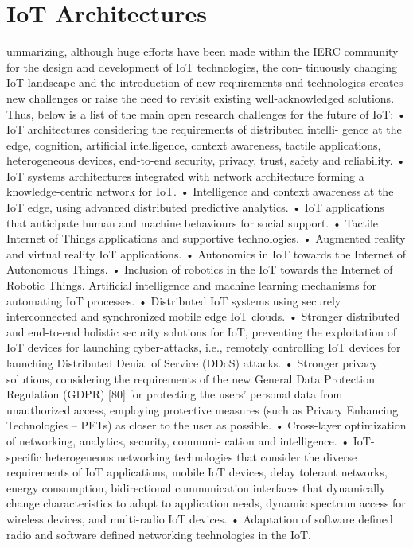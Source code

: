 \section{IoT Architectures}
ummarizing, although huge efforts have been made within the IERC
community for the design and development of IoT technologies, the con-
tinuously changing IoT landscape and the introduction of new requirements
and technologies creates new challenges or raise the need to revisit existing
well-acknowledged solutions. Thus, below is a list of the main open research
challenges for the future of IoT:
• IoT architectures considering the requirements of distributed intelli-
gence at the edge, cognition, artificial intelligence, context awareness,
tactile applications, heterogeneous devices, end-to-end security, privacy,
trust, safety and reliability.
• IoT systems architectures integrated with network architecture forming
a knowledge-centric network for IoT.
• Intelligence and context awareness at the IoT edge, using advanced
distributed predictive analytics.
• IoT applications that anticipate human and machine behaviours for
social support.
• Tactile Internet of Things applications and supportive technologies.
• Augmented reality and virtual reality IoT applications.
• Autonomics in IoT towards the Internet of Autonomous Things.
• Inclusion of robotics in the IoT towards the Internet of Robotic Things.
Artificial intelligence and machine learning mechanisms for automating
IoT processes.
• Distributed IoT systems using securely interconnected and synchronized
mobile edge IoT clouds.
• Stronger distributed and end-to-end holistic security solutions for IoT,
preventing the exploitation of IoT devices for launching cyber-attacks,
i.e., remotely controlling IoT devices for launching Distributed Denial
of Service (DDoS) attacks.
• Stronger privacy solutions, considering the requirements of the new
General Data Protection Regulation (GDPR) [80] for protecting the
users’ personal data from unauthorized access, employing protective
measures (such as Privacy Enhancing Technologies – PETs) as closer
to the user as possible.
• Cross-layer optimization of networking, analytics, security, communi-
cation and intelligence.
• IoT-specific heterogeneous networking technologies that consider the
diverse requirements of IoT applications, mobile IoT devices, delay
tolerant networks, energy consumption, bidirectional communication
interfaces that dynamically change characteristics to adapt to application
needs, dynamic spectrum access for wireless devices, and multi-radio
IoT devices.
• Adaptation of software defined radio and software defined networking
technologies in the IoT.


